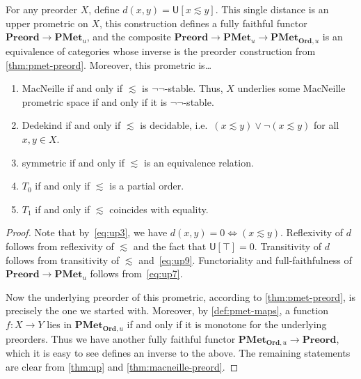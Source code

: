 \documentclass{article}
\def\U[#1]{\mathsf{U}[#1]}
\def\leapx{\lesssim}
\def\nn{\ensuremath{\neg\neg}}
\def\PMetu{\mathbf{PMet}_u}
\def\PMetOrdu{\mathbf{PMet}_{\mathbf{Ord},u}}
\def\Preord{\mathbf{Preord}}
\begin{document}
\begin{thm}\label{thm:preord-pmetu}
  For any preorder $X$, define $d(x,y) = \U[x\leapx y]$.
  This single distance is an upper prometric on $X$, this construction defines a fully faithful functor $\Preord \to \PMetu$, and the composite $\Preord \to \PMetu \to \PMetOrdu$ is an equivalence of categories whose inverse is the preorder construction from \cref{thm:pmet-preord}.
  Moreover, this prometric is\dots
  \begin{enumerate}
  \item MacNeille if and only if $\leapx$ is \nn-stable.
    Thus, $X$ underlies some MacNeille prometric space if and only if it is \nn-stable.
  \item Dedekind if and only if $\leapx$ is decidable, i.e.\ $(x\leapx y) \lor \neg(x\leapx y)$ for all $x,y\in X$.
  \item symmetric if and only if $\leapx$ is an equivalence relation.
  \item $T_0$ if and only if $\leapx$ is a partial order.
  \item $T_1$ if and only if $\leapx$ coincides with equality.
  \end{enumerate}
\end{thm}
\begin{proof}
  Note that by~\eqref{eq:up3}, we have $d(x,y)=0 \iff (x\leapx y)$.
  Reflexivity of $d$ follows from reflexivity of $\leapx$ and the fact that $\U[\top]=0$.
  Transitivity of $d$ follows from transitivity of $\leapx$ and~\eqref{eq:up9}.
  Functoriality and full-faithfulness of $\Preord \to \PMetu$ follows from~\eqref{eq:up7}.
  
  Now the underlying preorder of this prometric, according to \cref{thm:pmet-preord}, is precisely the one we started with.
  Moreover, by \cref{def:pmet-maps}, a function $f:X\to Y$ lies in $\PMetOrdu$ if and only if it is monotone for the underlying preorders.
  Thus we have another fully faithful functor $\PMetOrdu \to \Preord$, which it is easy to see defines an inverse to the above.
  The remaining statements are clear from \cref{thm:up} and \cref{thm:macneille-preord}.
\end{proof}
\end{document}
